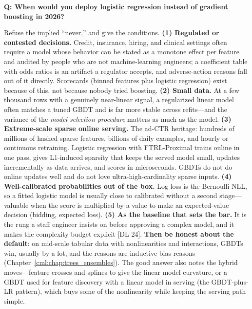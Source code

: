 \begin{interviewq}
\textbf{Q: When would you deploy logistic regression instead of gradient boosting in 2026?}

 \quad {} \quad \badgefreq{\freqhigh}

\stronganswer

Refuse the implied ``never,'' and give the conditions. \textbf{(1) Regulated or contested decisions.} Credit, insurance, hiring, and clinical settings often require a model whose behavior can be stated as a monotone effect per feature and audited by people who are not machine-learning engineers; a coefficient table with odds ratios is an artifact a regulator accepts, and adverse-action reasons fall out of it directly. Scorecards (binned features plus logistic regression) exist because of this, not because nobody tried boosting. \textbf{(2) Small data.} At a few thousand rows with a genuinely near-linear signal, a regularized linear model often matches a tuned GBDT and is far more stable across refits---and the variance of the \emph{model selection procedure} matters as much as the model. \textbf{(3) Extreme-scale sparse online serving.} The ad-CTR heritage: hundreds of millions of hashed sparse features, billions of daily examples, and hourly or continuous retraining. Logistic regression with FTRL-Proximal trains online in one pass, gives L1-induced sparsity that keeps the served model small, updates incrementally as data arrives, and scores in microseconds. GBDTs do not do online updates well and do not love ultra-high-cardinality sparse inputs. \textbf{(4) Well-calibrated probabilities out of the box.} Log loss is the Bernoulli NLL, so a fitted logistic model is usually close to calibrated without a second stage---valuable when the score is multiplied by a value to make an expected-value decision (bidding, expected loss). \textbf{(5) As the baseline that sets the bar.} It is the rung a staff engineer insists on before approving a complex model, and it makes the complexity budget explicit [DL 24]. \textbf{Then be honest about the default}: on mid-scale tabular data with nonlinearities and interactions, GBDTs win, usually by a lot, and the reasons are inductive-bias reasons (Chapter~\ref{cml:chap:trees_ensembles}). The good answer also notes the hybrid moves---feature crosses and splines to give the linear model curvature, or a GBDT used for feature discovery with a linear model in serving (the GBDT-plus-LR pattern), which buys some of the nonlinearity while keeping the serving path simple.


\end{interviewq}
